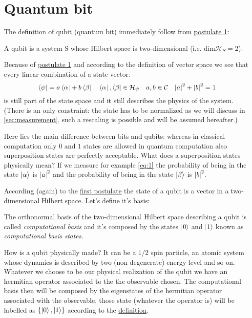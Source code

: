 \section{Quantum bit}
The definition of qubit (quantum bit) immediately follow from \hyperref[postulate:1]{postulate 1}:
\begin{defn}
A qubit is a system S whose Hilbert space is two-dimensional (i.e. $\text{dim}\mathcal{H}_S = 2$).
\end{defn}
Because of \hyperref[postulate:1]{postulate 1} and according to the definition of vector space we see that every linear combination of a state vector.
\begin{equation}\label{eq:1}
    \bra{\psi} = a \bra{\alpha} + b \bra{\beta} \quad \bra{\alpha},\bra{\beta} \in \mathcal{H}_\psi \quad a,b \in \mathcal{C} \quad \abs{a}^2 + \abs{b}^2 = 1
\end{equation}
is still part of the state space and it still describes the physics of the system. (There is an only constraint: the state has to be normalized as we will discuss in \ref{sec:measurement}, such a rescaling is possible and will be assumed hereafter.) 

Here lies the main difference between bits and qubits: whereas in classical computation only $0$ and $1$ states are allowed in quantum computation also superposition states are perfectly acceptable. What does a superposition states physically mean? If we measure for example \ref{eq:1} the probability of being in the state $\ket{\alpha}$ is  $\abs{a}^2$ and the probability of being in the state $\ket{\beta}$ is $\abs{b}^2$.

According (again) to the \hyperref[postulate:1]{first postulate} the state of a qubit is a vector in a two-dimensional Hilbert space. Let's define it's basis:
\begin{defn}\label{def:computational-basis}
The orthonormal basis of the two-dimensional Hilbert space describing a qubit is called \emph{computational basis} and it's composed by the states $\ket{0}$ and $\ket{1}$ known as \emph{computational basis states}.
\end{defn}
How is a qubit physically made?
It can be a $1/2$ spin particle, an atomic system whose dynamics is described by two (non degenerate) energy level and so on.
Whatever we choose to be our physical realization of the qubit we have an hermitian operator associated to the the observable chosen. The computational basis then will be composed by the eigenstates of the hermitian operator associated with the observable, those state (whatever the operator is) will be labelled as $\{\ket{0},\ket{1}\}$ according to the \hyperref[def:computational-basis]{definition}.

